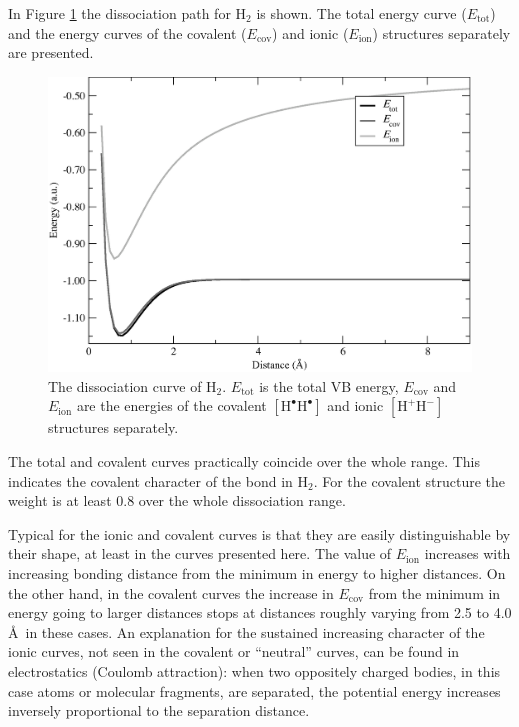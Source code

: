 In Figure \ref{ch3.fig.h2_c} the dissociation path for H$_2$ is shown. The total energy curve ($E_\mathrm{tot}$) and the energy curves of the covalent ($E_\mathrm{cov}$) and ionic ($E_\mathrm{ion}$) structures separately are presented. 
\begin{figure}[htbp]
\begin{center}
\includegraphics[scale=0.6]{dissociation/figures/h2_g.eps}
\end{center}
\caption{The dissociation curve of H$_2$. $E_\mathrm{tot}$ is the total VB energy, $E_\mathrm{cov}$  and $E_\mathrm{ion}$ are the energies of the covalent $[\mathrm{H^\bullet H^\bullet}]$ and ionic $[\mathrm{H^{+}H^{-}}]$ structures separately.}
\label{ch3.fig.h2_c}
\end{figure}
The total and covalent curves practically coincide over the whole range. This indicates the covalent character of the bond in H$_2$. For the covalent structure the weight is at least 0.8 over the whole dissociation range.

Typical for the ionic and covalent curves is that they are easily distinguishable by their shape, at least in the curves presented here. The value of $E_\mathrm{ion}$ increases with increasing bonding distance from the minimum in energy to higher distances. On the other hand, in the covalent curves the increase in $E_\mathrm{cov}$ from the minimum in energy going to larger distances stops at distances roughly varying from 2.5 to 4.0 \AA\ in these cases. An explanation for the sustained increasing character of the ionic curves, not seen in the covalent or ``neutral'' curves, can be found in electrostatics (Coulomb attraction): when two oppositely charged bodies, in this case atoms or molecular fragments, are separated, the potential energy increases inversely proportional to the separation distance.

